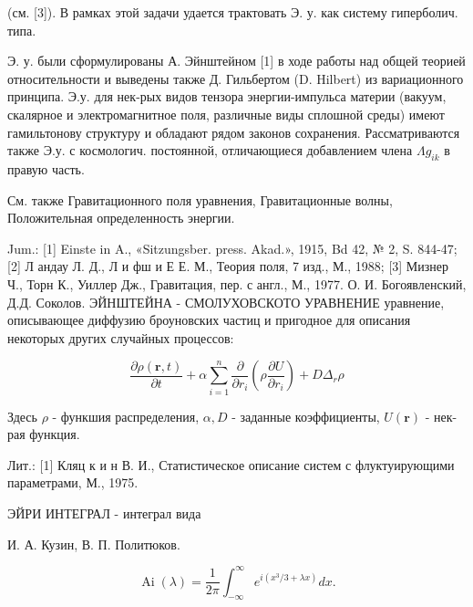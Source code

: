 \documentclass[10pt]{article}
\begin{document}
(см. [3]). В рамках этой задачи удается трактовать Э. у. как систему гиперболич. типа.



Э. у. были сформулированы А. Эйнштейном [1] в ходе работы над общей теорией относительности и выведены также Д. Гильбертом (D. Hilbert) из вариационного принципа. Э.у. для нек-рых видов тензора энергии-импульса материи (вакуум, скалярное и электромагнитное поля, различные виды сплошной среды) имеют гамильтонову структуру и обладают рядом законов сохранения. Рассматриваются также Э.у. с космологич. постоянной, отличающиеся добавлением члена $\Lambda g_{i k}$ в правую часть.



См. также Гравитационного поля уравнения, Гравитационные волны, Положительная определенность энергии.



Jum.: [1] Einste in A., «Sitzungsber. press. Akad.», 1915, Bd 42, № 2, S. 844-47; [2] Л андау Л. Д., Л и фш и Е Е. М., Теория поля, 7 изд., М., 1988; [3] Мизнер Ч., Торн К., Уиллер Дж., Гравитация, пер. с англ., М., 1977. О. И. Богоявленский, Д.Д. Соколов. ЭЙНШТЕЙНА - СМОЛУХОВСКОТО УРАВНЕНИЕ уравнение, описывающее диффузию броуновских частиц и пригодное для описания некоторых других случайных процессов:



\[

\frac{\partial \rho(\boldsymbol{r}, t)}{\partial t}+\alpha \sum_{i=1}^{n} \frac{\partial}{\partial r_{i}}\left(\rho \frac{\partial U}{\partial r_{i}}\right)+D \Delta_{r} \rho

\]



Здесь $\rho$ - функшия распределения, $\alpha, D$ - заданные коэффициенты, $U(\boldsymbol{r})$ - нек-рая функция.



Лит.: [1] Кляц к и н В. И., Статистическое описание систем с флуктуирующими параметрами, М., 1975.



ЭЙРИ ИНТЕГРАЛ - интеграл вида



И. А. Кузин, В. П. Политюков.



\[

\operatorname{Ai}(\lambda)=\frac{1}{2 \pi} \int_{-\infty}^{\infty} e^{i\left(x^{3} / 3+\lambda x\right)} d x .

\]
\end{document}

